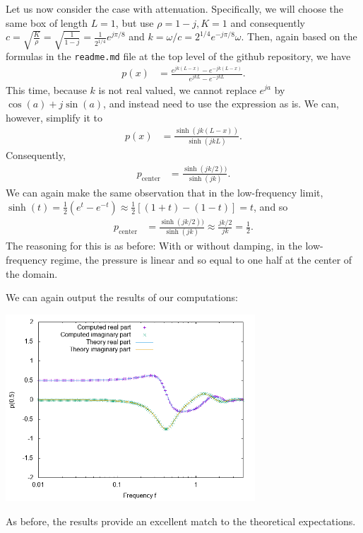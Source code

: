 \documentclass{article}
\begin{document}
Let us now consider the case with attenuation. Specifically, we will
choose the same box of length $L=1$, but use $\rho=1-j, K=1$ and
consequently $c=\sqrt{\frac{K}{\rho}}=\sqrt{\frac{1}{1-j}}=\frac{1}{2^{1/4}}e^{j\pi/8}$ 
and $k=\omega/c=2^{1/4}e^{-j\pi/8} \omega$. Then, again based
on the formulas in the \texttt{readme.md} file at the top level of the
github repository, we have
\begin{align*}
  p(x)
  &=
  \frac{e^{jk(L-x)} - e^{-jk(L-x)}}{e^{jkL} - e^{-jkL}}.
\end{align*}
This time, because $k$ is not real valued, we cannot replace $e^{ja}$
by $\cos(a)+j\sin(a)$, and instead need to use the expression as
is. We can, however, simplify it to
\begin{align*}
  p(x)
  &=
  \frac{\sinh(jk(L-x))}{\sinh(jkL)}.
\end{align*}
Consequently,
\begin{align*}
  p_\text{center}
  &=
  \frac{\sinh(jk/2))}{\sinh(jk)}.
\end{align*}
We can again make the same observation that in the low-frequency
limit, $\sinh(t)=\frac 12(e^t-e^{-t})\approx \frac 12[(1+t)-(1-t)]=t$,
and so
\begin{align*}
  p_\text{center}
  &=
  \frac{\sinh(jk/2))}{\sinh(jk)}
  \approx
  \frac{jk/2}{jk}
  = \frac 12.
\end{align*}
The reasoning for this is as before: With or without damping, in the
low-frequency regime, the pressure is linear and so equal to one half
at the center of the domain.

We can again output the results of our computations:
\begin{center}
\includegraphics[width=0.7\textwidth]{with-attenuation/pressure-at-center.png}
\end{center}
As before, the results provide an excellent match to the theoretical expectations.
\end{document}
